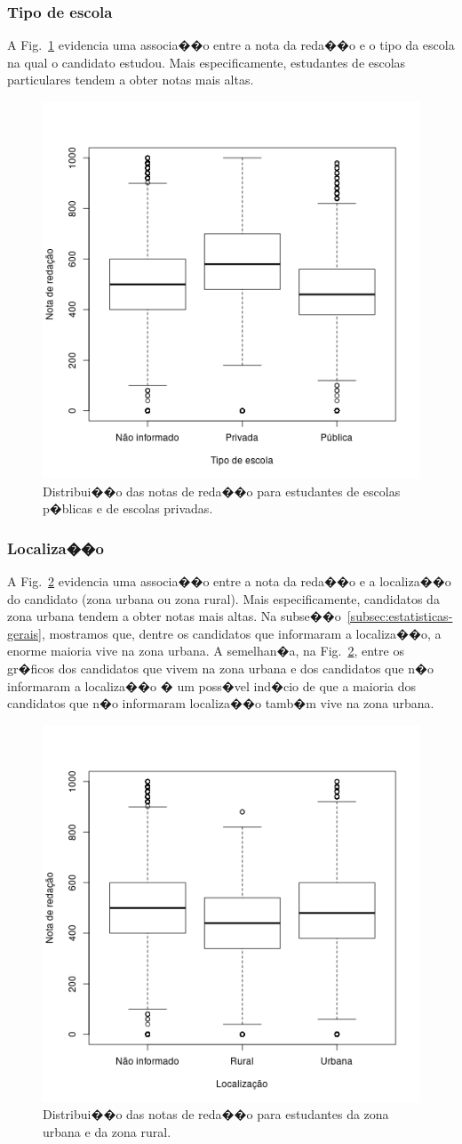 \documentclass[12pt]{article}
\newcommand{\reffig}[1]{Fig.~\ref{fig:#1}}
\begin{document}
\subsubsection{Tipo de escola}
A \reffig{correlacao-escola} evidencia uma associa��o entre a nota da reda��o e o tipo da escola na qual o candidato estudou.
Mais especificamente, estudantes de escolas particulares tendem a obter notas mais altas.

\begin{figure}[H]
\centering\includegraphics[width=.5\linewidth]{../correlacao_escola.png}
\caption{Distribui��o das notas de reda��o para estudantes de escolas p�blicas e de escolas privadas.}
\label{fig:correlacao-escola}
\end{figure}

\subsubsection{Localiza��o}
A \reffig{correlacao-localizacao} evidencia uma associa��o entre a nota da reda��o e a localiza��o do candidato (zona urbana ou zona rural).
Mais especificamente, candidatos da zona urbana tendem a obter notas mais altas.
Na subse��o~\ref{subsec:estatisticas-gerais}, mostramos que, dentre os candidatos que informaram a localiza��o, a enorme maioria vive na zona urbana.
A semelhan�a, na \reffig{correlacao-localizacao}, entre os gr�ficos dos candidatos que vivem na zona urbana e dos candidatos que n�o informaram a localiza��o � um poss�vel ind�cio de que a maioria dos candidatos que n�o informaram localiza��o tamb�m vive na zona urbana.

\begin{figure}[H]
\centering\includegraphics[width=.44\linewidth]{../correlacao_localizacao.png}
\caption{Distribui��o das notas de reda��o para estudantes da zona urbana e da zona rural.}
\label{fig:correlacao-localizacao}
\end{figure}
\end{document}
